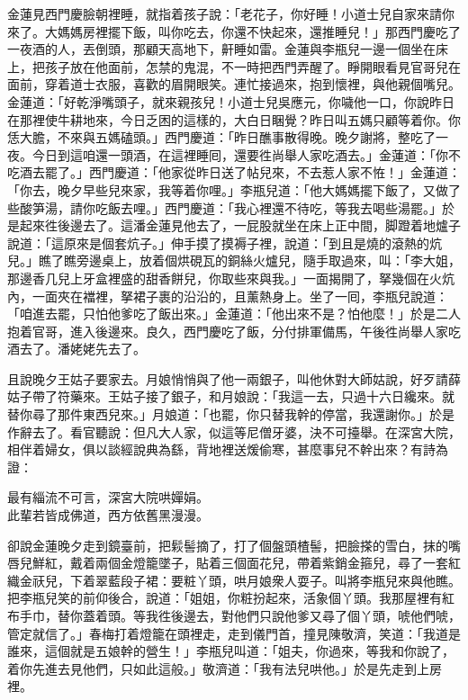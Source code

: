 金蓮見西門慶臉朝裡睡，就指着孩子說：「老花子，你好睡！小道士兒自家來請你來了。大媽媽房裡擺下飯，叫你吃去，你還不快起來，還推睡兒！」那西門慶吃了一夜酒的人，丟倒頭，那顧天高地下，鼾睡如雷。金蓮與李瓶兒一邊一個坐在床上，把孩子放在他面前，怎禁的鬼混，不一時把西門弄醒了。睜開眼看見官哥兒在面前，穿着道士衣服，喜歡的眉開眼笑。連忙接過來，抱到懷裡，與他親個嘴兒。金蓮道：「好乾淨嘴頭子，就來親孩兒！小道士兒吳應元，你噦他一口，你說昨日在那裡使牛耕地來，今日乏困的這樣的，大白日睏覺？昨日叫五媽只顧等着你。你恁大膽，不來與五媽磕頭。」{}西門慶道：「昨日醮事散得晚。晚夕謝將，整吃了一夜。今日到這咱還一頭酒，在這裡睡囘，還要徃尚舉人家吃酒去。」金蓮道：「你不吃酒去罷了。」西門慶道：「他家從昨日送了帖兒來，不去惹人家不恠！」金蓮道：「你去，晚夕早些兒來家，我等着你哩。」李瓶兒道：「他大媽媽擺下飯了，又做了些酸笋湯，請你吃飯去哩。」西門慶道：「我心裡還不待吃，等我去喝些湯罷。」於是起來徃後邊去了。這潘金蓮見他去了，一屁股就坐在床上正中間，脚蹬着地爐子說道：「這原來是個套炕子。」伸手摸了摸褥子裡，說道：「到且是燒的滾熱的炕兒。」瞧了瞧旁邊桌上，放着個烘硯瓦的銅絲火爐兒，隨手取過來，叫：「李大姐，那邊香几兒上牙盒裡盛的甜香餅兒，你取些來與我。」一面揭開了，拏幾個在火炕內，一面夾在襠裡，拏裙子裹的沿沿的，且薰熱身上。坐了一囘，李瓶兒說道：「咱進去罷，只怕他爹吃了飯出來。」金蓮道：「他出來不是？怕他麼！」於是二人抱着官哥，進入後邊來。良久，西門慶吃了飯，分付排軍備馬，午後徃尚舉人家吃酒去了。潘姥姥先去了。

且說晚夕王姑子要家去。月娘悄悄與了他一兩銀子，叫他休對大師姑說，好歹請薛姑子帶了符藥來。王姑子接了銀子，和月娘說：「我這一去，只過十六日纔來。就替你尋了那件東西兒來。」月娘道：「也罷，你只替我幹的停當，我還謝你。」於是作辭去了。看官聽說：但凡大人家，似這等尼僧牙婆，決不可擡舉。在深宮大院，相伴着婦女，俱以談經說典為繇，背地裡送煖偷寒，甚麼事兒不幹出來？有詩為證：

\begin{myquote}
最有緇流不可言，深宮大院哄嬋娟。\\此輩若皆成佛道，西方依舊黑漫漫。
\end{myquote}

卻說金蓮晚夕走到鏡臺前，把鬏髻摘了，打了個盤頭楂髻，把臉搽的雪白，抹的嘴唇兒鮮紅，戴着兩個金燈籠墜子，貼着三個面花兒，帶着紫銷金箍兒，尋了一套紅織金祆兒，下着翠藍段子裙：要粧丫頭，哄月娘衆人耍子。叫將李瓶兒來與他瞧。把李瓶兒笑的前仰後合，說道：「姐姐，你粧扮起來，活象個丫頭。我那屋裡有紅布手巾，替你蓋着頭。等我徃後邊去，對他們只說他爹又尋了個丫頭，唬他們唬，{}管定就信了。」春梅打着燈籠在頭裡走，走到儀門首，撞見陳敬濟，笑道：「我道是誰來，這個就是五娘幹的營生！」李瓶兒叫道：「姐夫，你過來，等我和你說了，着你先進去見他們，只如此這般。」敬濟道：「我有法兒哄他。」於是先走到上房裡。

